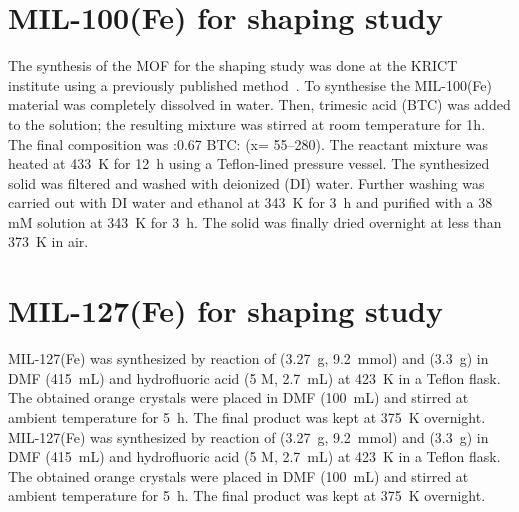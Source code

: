 \section{MIL-100(Fe) for shaping study}%
\label{appx:synthesis:mil100shaping}

The synthesis of the MOF for the shaping study was 
done at the KRICT institute using a previously
published method~\cite{jeremiasAmbientPressureSynthesis2016}.
To synthesise the MIL-100(Fe) material 
 was completely dissolved in water.
Then, trimesic acid (BTC) was added to the
solution; the resulting mixture was stirred at room temperature 
for 1h. The final composition was :0.67 BTC: 
(x= 55–280). The reactant mixture was heated at \SI{433}{\kelvin} for
\SI{12}{\hour} using a Teflon-lined pressure vessel. The synthesized 
solid was filtered and washed with deionized (DI) water.
Further washing was carried out with DI water and ethanol at
\SI{343}{\kelvin} for \SI{3}{\hour} and purified with a 
38 mM  solution at \SI{343}{\kelvin} for \SI{3}{\hour}. 
The solid was finally dried overnight at less than 
\SI{373}{\kelvin} in air.

\section{MIL-127(Fe) for shaping study}%
\label{appx:synthesis:mil127shaping}

MIL-127(Fe) was synthesized by reaction of
 (\SI{3.27}{\gram}, \SI{9.2}{\milli\mol}) and 
 (\SI{3.3}{\gram}) in DMF (\SI{415}{\milli\liter}) 
and hydrofluoric acid (5 M, \SI{2.7}{\milli\liter}) at 
\SI{423}{\kelvin} in a Teflon
flask. The obtained orange crystals were placed in 
DMF (\SI{100}{\milli\liter}) and stirred at ambient temperature for 
\SI{5}{\hour}. The final product was kept at 
\SI{375}{\kelvin} overnight. MIL-127(Fe) was synthesized by reaction of
 (\SI{3.27}{\gram}, \SI{9.2}{\milli\mol}) and 
 (\SI{3.3}{\gram}) in DMF
(\SI{415}{\milli\liter}) and hydrofluoric acid (5 M, 
\SI{2.7}{\milli\liter}) at \SI{423}{\kelvin} in a Teflon 
flask. The obtained orange crystals were placed in DMF 
(\SI{100}{\milli\liter}) and stirred at ambient temperature 
for \SI{5}{\hour}. The final product was
kept at \SI{375}{\kelvin} overnight.


